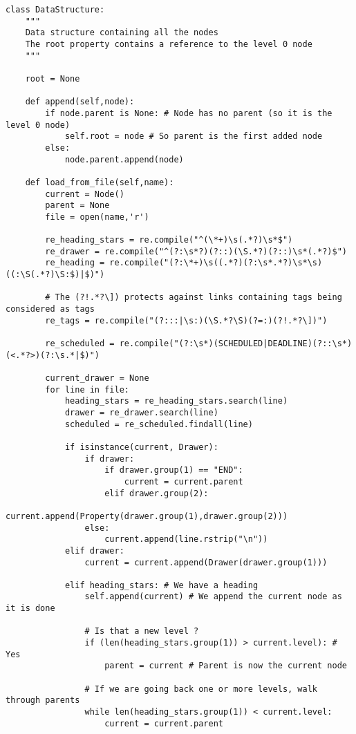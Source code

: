 \documentclass[11pt]{article}
\begin{document}
\begin{verbatim}
class DataStructure:
    """
    Data structure containing all the nodes
    The root property contains a reference to the level 0 node
    """

    root = None

    def append(self,node):
        if node.parent is None: # Node has no parent (so it is the level 0 node)
            self.root = node # So parent is the first added node
        else:
            node.parent.append(node)

    def load_from_file(self,name):
        current = Node()
        parent = None
        file = open(name,'r')

        re_heading_stars = re.compile("^(\*+)\s(.*?)\s*$")
        re_drawer = re.compile("^(?:\s*?)(?::)(\S.*?)(?::)\s*(.*?)$")
        re_heading = re.compile("(?:\*+)\s((.*?)(?:\s*.*?)\s*\s)((:\S(.*?)\S:$)|$)")

        # The (?!.*?\]) protects against links containing tags being considered as tags
        re_tags = re.compile("(?:::|\s:)(\S.*?\S)(?=:)(?!.*?\])")

        re_scheduled = re.compile("(?:\s*)(SCHEDULED|DEADLINE)(?::\s*)(<.*?>)(?:\s.*|$)")

        current_drawer = None
        for line in file:
            heading_stars = re_heading_stars.search(line)
            drawer = re_drawer.search(line)
            scheduled = re_scheduled.findall(line)

            if isinstance(current, Drawer):
                if drawer:
                    if drawer.group(1) == "END":
                        current = current.parent
                    elif drawer.group(2):
                        current.append(Property(drawer.group(1),drawer.group(2)))
                else:
                    current.append(line.rstrip("\n"))
            elif drawer:
                current = current.append(Drawer(drawer.group(1)))

            elif heading_stars: # We have a heading
                self.append(current) # We append the current node as it is done

                # Is that a new level ?
                if (len(heading_stars.group(1)) > current.level): # Yes
                    parent = current # Parent is now the current node

                # If we are going back one or more levels, walk through parents
                while len(heading_stars.group(1)) < current.level:
                    current = current.parent


\end{verbatim}
\end{document}

